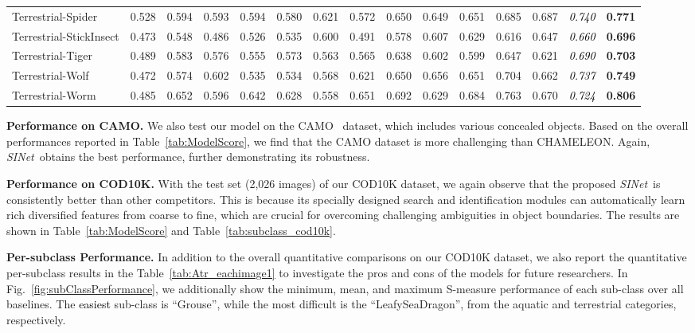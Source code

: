 \documentclass[10pt,journal,compsoc]{IEEEtran}
\newcommand{\myPara}[1]{\vspace{6pt}\noindent\textbf{#1}\qquad }
\newcommand{\figref}[1]{Fig.~\ref{#1}}
\newcommand{\tabref}[1]{Table~\ref{#1}}
\newcommand{\Rev}[1]{\textcolor{black}{#1}}
\def\ournewmodel{\emph{SINet}}
\begin{document}
\begin{table*}[thp!]
\begin{tabular}{l | ccccc ccccc cccc}
Terrestrial-Spider &0.528 &0.594 &0.593 &0.594 &0.580 &0.621 &0.572 &0.650 &0.649 &0.651 &0.685 &0.687 & \Rev{\textit{0.740}} &\textbf{0.771}\\
\rowcolor{mygray}
Terrestrial-StickInsect &0.473 &0.548 &0.486 &0.526 &0.535 &0.600 &0.491 &0.578 &0.607 &0.629 &0.616 &0.647 & \Rev{\textit{0.660}} &\textbf{0.696}\\
Terrestrial-Tiger &0.489 &0.583 &0.576 &0.555 &0.573 &0.563 &0.565 &0.638 &0.602 &0.599 &0.647 &0.621 & \Rev{\textit{0.690}} &\textbf{0.703}\\
\rowcolor{mygray}
Terrestrial-Wolf &0.472 &0.574 &0.602 &0.535 &0.534 &0.568 &0.621 &0.650 &0.656 &0.651 &0.704 &0.662 & \Rev{\textit{0.737}} &\textbf{0.749}\\
Terrestrial-Worm &0.485 &0.652 &0.596 &0.642 &0.628 &0.558 &0.651 &0.692 &0.629 &0.684 &0.763 &0.670 & \Rev{\textit{0.724}} &\textbf{0.806}\\

  \bottomrule
  \end{tabular}
\end{table*}


\myPara{Performance on CAMO.}
%
We also test our model on the CAMO~\cite{le2019anabranch} dataset, 
which includes various concealed objects.
%
Based on the overall performances reported in \tabref{tab:ModelScore}, 
we find that the CAMO dataset is more challenging than CHAMELEON.
%
Again, \ournewmodel~obtains the best performance, 
further demonstrating its robustness.


\myPara{Performance on COD10K.}
%
With the test set (2,026 images) of our COD10K dataset, 
we again observe that the proposed \ournewmodel~is consistently 
better than other competitors.
%
This is because its specially designed search and identification modules 
can automatically learn rich diversified features from coarse to fine, 
which are crucial for overcoming challenging ambiguities in object boundaries.
The results are shown in \tabref{tab:ModelScore} and 
\tabref{tab:subclass_cod10k}.

\myPara{Per-subclass Performance.}
In addition to the overall quantitative comparisons on our COD10K dataset, 
we also report the quantitative per-subclass results in the 
\tabref{tab:Atr_eachimage1} to investigate the pros and cons of the models 
for future researchers.
%
In \figref{fig:subClassPerformance}, we additionally show the minimum, mean, 
and maximum S-measure performance of each sub-class over all baselines.
The \Rev{easiest} sub-class is ``Grouse'', 
while the most difficult is the ``LeafySeaDragon'', 
from the aquatic and terrestrial categories, respectively.
\end{document}
